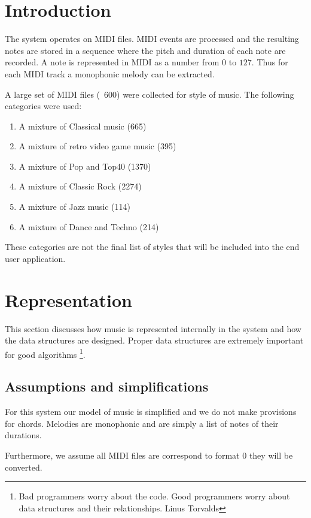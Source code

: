 

\chapter{Introduction}
The system operates on MIDI files. MIDI events are processed and the resulting notes are stored in a sequence where the pitch and duration of each note are recorded. A note is represented in MIDI as a number from $0$ to $127$.
Thus for each MIDI track a monophonic melody can be extracted.

A large set of MIDI files (~600) were collected for style of music. The following categories were used:
\begin{enumerate}
\item A mixture of Classical music (665)
\item A mixture of retro video game music (395)
\item A mixture of Pop and Top40 (1370)
\item A mixture of Classic Rock (2274)
\item A mixture of Jazz music (114)
\item A mixture of Dance and Techno (214)
\end{enumerate}

These categories are not the final list of styles that will be included into the end user application.


\chapter{Representation}
This section discusses how music is represented internally in the system and how the data structures are designed. 
Proper data structures are extremely important for good algorithms \footnote{Bad programmers worry about the code. Good programmers worry about data structures and their relationships. Linus Torvalds}.

\section{Assumptions and simplifications}
For this system our model of music is simplified and we do not make provisions for chords. Melodies are monophonic and are simply a list of notes of their durations.

Furthermore, we assume all MIDI files are correspond to format 0 they will be converted. 

